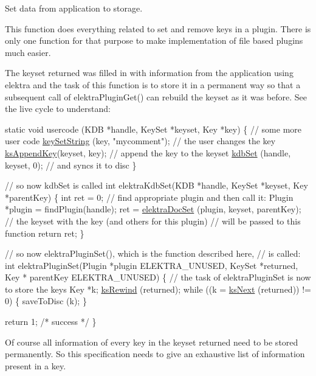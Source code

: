 Set data from application to storage. 

This function does everything related to set and remove keys in a plugin. There is only one function for that purpose to make implementation of file based plugins much easier.

The keyset {\ttfamily returned} was filled in with information from the application using elektra and the task of this function is to store it in a permanent way so that a subsequent call of elektra\-Plugin\-Get() can rebuild the keyset as it was before. See the live cycle to understand\-:


\begin{DoxyCodeInclude}
\textcolor{keyword}{static} \textcolor{keywordtype}{void} usercode (KDB *handle, KeySet *keyset, Key *key)
\{
        \textcolor{comment}{// some more user code}
        \hyperlink{group__keyvalue_ga622bde1eb0e0c4994728331326340ef2}{keySetString} (key, \textcolor{stringliteral}{"mycomment"}); \textcolor{comment}{// the user changes the
       key}
        \hyperlink{group__keyset_gaa5a1d467a4d71041edce68ea7748ce45}{ksAppendKey}(keyset, key); \textcolor{comment}{// append the key to the keyset}
        \hyperlink{group__kdb_ga11436b058408f83d303ca5e996832bcf}{kdbSet} (handle, keyset, 0); \textcolor{comment}{// and syncs it to disc}
\}

\textcolor{comment}{// so now kdbSet is called}
\textcolor{keywordtype}{int} elektraKdbSet(KDB *handle, KeySet *keyset, Key *parentKey)
\{
        \textcolor{keywordtype}{int} ret = 0;
        \textcolor{comment}{// find appropriate plugin and then call it:}
        Plugin *plugin = findPlugin(handle);
        ret = \hyperlink{group__plugin_gae65781a1deb34efc79c8cb9d9174842c}{elektraDocSet} (plugin, keyset, parentKey);
        \textcolor{comment}{// the keyset with the key (and others for this plugin)}
        \textcolor{comment}{// will be passed to this function}
        \textcolor{keywordflow}{return} ret;
\}

\textcolor{comment}{// so now elektraPluginSet(), which is the function described here,}
\textcolor{comment}{// is called:}
\textcolor{keywordtype}{int} elektraPluginSet(Plugin *plugin ELEKTRA\_UNUSED, KeySet *returned, Key *
      parentKey ELEKTRA\_UNUSED)
\{
        \textcolor{comment}{// the task of elektraPluginSet is now to store the keys}
        Key *k;
        \hyperlink{group__keyset_gabe793ff51f1728e3429c84a8a9086b70}{ksRewind} (returned);
        \textcolor{keywordflow}{while} ((k = \hyperlink{group__keyset_ga317321c9065b5a4b3e33fe1c399bcec9}{ksNext} (returned)) != 0)
        \{
                saveToDisc (k);
        \}

        \textcolor{keywordflow}{return} 1; \textcolor{comment}{/* success */}
\}
\end{DoxyCodeInclude}
 Of course all information of every key in the keyset {\ttfamily returned} need to be stored permanently. So this specification needs to give an exhaustive list of information present in a key.

